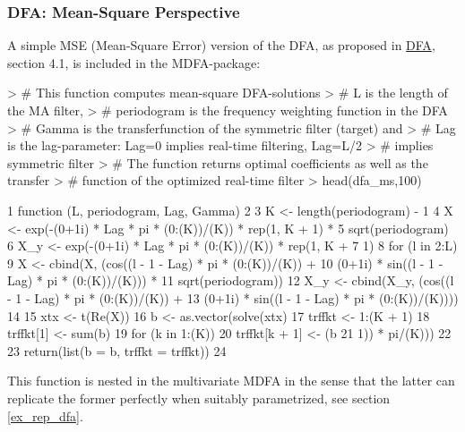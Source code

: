 \documentclass[a4paper]{book}
\begin{document}
\subsubsection{DFA: Mean-Square Perspective}

A simple MSE (Mean-Square Error) version of the DFA, as proposed in \href{http://blog.zhaw.ch/sef/files/2014/10/DFA.pdf}{DFA}, section 4.1, is included in the MDFA-package:  

\begin{Schunk}
\begin{Sinput}
> # This function computes mean-square DFA-solutions
> # L is the length of the MA filter,
> # periodogram is the frequency weighting function in the DFA
> # Gamma is the transferfunction of the symmetric filter (target) and
> # Lag is the lag-parameter: Lag=0 implies real-time filtering, Lag=L/2
> #     implies symmetric filter
> # The function returns optimal coefficients as well as the transfer 
> #     function of the optimized real-time filter
> head(dfa_ms,100)
\end{Sinput}
\begin{Soutput}
1  function (L, periodogram, Lag, Gamma)                                    
2  {                                                                        
3      K <- length(periodogram) - 1                                         
4      X <- exp(-(0+1i) * Lag * pi * (0:(K))/(K)) * rep(1, K + 1) *         
5          sqrt(periodogram)                                                
6      X_y <- exp(-(0+1i) * Lag * pi * (0:(K))/(K)) * rep(1, K +            
7          1)                                                               
8      for (l in 2:L) {                                                     
9          X <- cbind(X, (cos((l - 1 - Lag) * pi * (0:(K))/(K)) +           
10             (0+1i) * sin((l - 1 - Lag) * pi * (0:(K))/(K))) *            
11             sqrt(periodogram))                                           
12         X_y <- cbind(X_y, (cos((l - 1 - Lag) * pi * (0:(K))/(K)) +       
13             (0+1i) * sin((l - 1 - Lag) * pi * (0:(K))/(K))))             
14     }                                                                    
15     xtx <- t(Re(X)) %
16     b <- as.vector(solve(xtx) %
17     trffkt <- 1:(K + 1)                                                  
18     trffkt[1] <- sum(b)                                                  
19     for (k in 1:(K)) {                                                   
20         trffkt[k + 1] <- (b %
21             1)) * pi/(K)))                                               
22     }                                                                    
23     return(list(b = b, trffkt = trffkt))                                 
24 }                                                                        
\end{Soutput}
\end{Schunk}
This function is nested in the multivariate MDFA in the sense that the latter can replicate the former perfectly when suitably parametrized, see section \ref{ex_rep_dfa}. 
\end{document}
